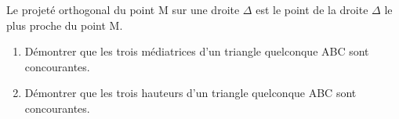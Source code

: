 







 


 



\begin{ROC}

Le projeté orthogonal du point M sur une droite $\Delta$ est le point de la droite $\Delta$ le plus
proche du point M.
\end{ROC}


\begin{Approfondissement}

\begin{enumerate}
\item Démontrer que les trois médiatrices d'un triangle quelconque ABC sont concourantes.
\item Démontrer que les trois hauteurs d'un triangle quelconque ABC sont concourantes.
\end{enumerate}

\end{Approfondissement}


 